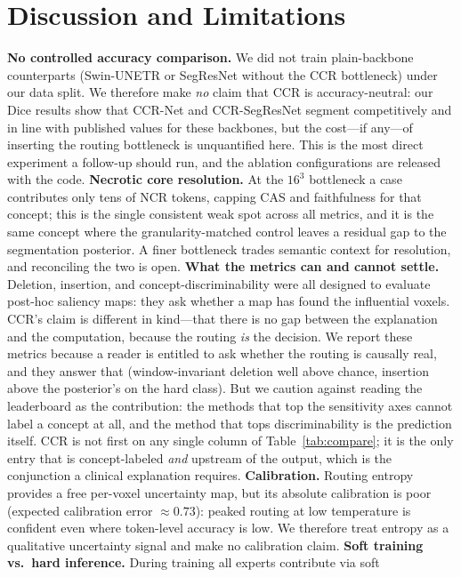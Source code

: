 \documentclass[runningheads]{llncs}
\begin{document}
\section{Discussion and Limitations}\label{sec:limitations}
\textbf{No controlled accuracy comparison.} We did not train plain-backbone counterparts
(Swin-UNETR or SegResNet without the CCR bottleneck) under our data split. We therefore make
\emph{no} claim that CCR is accuracy-neutral: our Dice results show that CCR-Net and
CCR-SegResNet segment competitively and in line with published values for these backbones, but
the cost---if any---of inserting the routing bottleneck is unquantified here. This is the most
direct experiment a follow-up should run, and the ablation configurations are released with the
code.
\textbf{Necrotic core resolution.} At the $16^3$ bottleneck a case contributes only tens of
NCR tokens, capping CAS and faithfulness for that concept; this is the single consistent
weak spot across all metrics, and it is the same concept where the granularity-matched control
leaves a residual gap to the segmentation posterior. A finer bottleneck trades semantic context
for resolution, and reconciling the two is open.
\textbf{What the metrics can and cannot settle.} Deletion, insertion, and
concept-discriminability were all designed to evaluate post-hoc saliency maps: they ask whether a
map has found the influential voxels. CCR's claim is different in kind---that there is no gap
between the explanation and the computation, because the routing \emph{is} the decision. We
report these metrics because a reader is entitled to ask whether the routing is causally real,
and they answer that (window-invariant deletion well above chance, insertion above the posterior's
on the hard class). But we caution against reading the leaderboard as the contribution: the
methods that top the sensitivity axes cannot label a concept at all, and the method that tops
discriminability is the prediction itself. CCR is not first on any single column of
Table~\ref{tab:compare}; it is the only entry that is concept-labeled \emph{and} upstream of the
output, which is the conjunction a clinical explanation requires.
\textbf{Calibration.} Routing entropy provides a free per-voxel uncertainty map, but its
absolute calibration is poor (expected calibration error $\approx0.73$): peaked routing at
low temperature is confident even where token-level accuracy is low. We therefore treat
entropy as a qualitative uncertainty signal and make no calibration claim.
\textbf{Soft training vs.\ hard inference.} During training all experts contribute via soft
\end{document}
